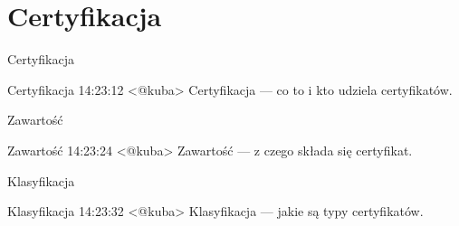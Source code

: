 \section{Certyfikacja}

\begin{frame}{Certyfikacja}
	\begin{alertblock}{Certyfikacja}
		14:23:12 <@kuba> Certyfikacja — co to i kto udziela certyfikatów.
	\end{alertblock}
\end{frame}

\begin{frame}{Zawartość}
	\begin{alertblock}{Zawartość}
		14:23:24 <@kuba> Zawartość — z czego składa się certyfikat.
	\end{alertblock}
\end{frame}

\begin{frame}{Klasyfikacja}
	\begin{alertblock}{Klasyfikacja}
		14:23:32 <@kuba> Klasyfikacja — jakie są typy certyfikatów.
	\end{alertblock}
\end{frame}